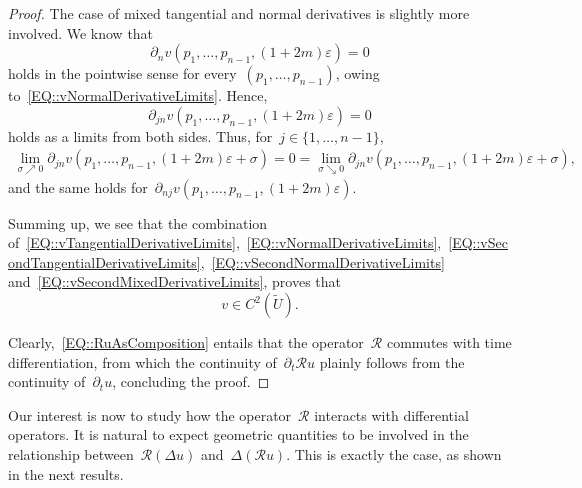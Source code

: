 \documentclass[12pt,a4paper]{amsart}
\numberwithin{equation}{section}
\theoremstyle{definition}
\theoremstyle{remark}
\newcommand{\eps}{\varepsilon}
\begin{document}
\begin{proof}
    The case of mixed tangential and normal derivatives is slightly more involved. We know that
    \begin{equation}
        \partial_n v(p_1, \dots, p_{n-1}, (1+2m)\eps) = 0
    \end{equation}
    holds in the pointwise sense for every~$(p_1,\dots,p_{n-1})$, owing to~\eqref{EQ::vNormalDerivativeLimits}. Hence,
    \begin{equation}
        \partial_{jn} v(p_1, \dots, p_{n-1}, (1+2m)\eps) = 0
    \end{equation}
    holds as a limits from both sides. Thus, for~$j \in \{1,\dots,n-1\}$,
    \begin{align}\label{EQ::vSecondMixedDerivativeLimits}
        \lim_{\sigma \nearrow 0} \partial_{jn} v(p_1, \dots, p_{n-1}, (1+2m)\eps + \sigma) = 0 = \lim_{\sigma \searrow 0} \partial_{jn} v(p_1, \dots, p_{n-1}, (1+2m)\eps + \sigma),
    \end{align}
    and the same holds for~$\partial_{nj} v(p_1, \dots, p_{n-1}, (1+2m)\eps)$.

    Summing up, we see that the combination of~\eqref{EQ::vTangentialDerivativeLimits},~\eqref{EQ::vNormalDerivativeLimits},~\eqref{EQ::vSecondTangentialDerivativeLimits},~\eqref{EQ::vSecondNormalDerivativeLimits} and~\eqref{EQ::vSecondMixedDerivativeLimits}, proves that
    \[v \in C^2(\tilde{U}).\]

    Clearly,~\eqref{EQ::RuAsComposition} entails that the operator~$\mathcal{R}$ commutes with time differentiation, from which the continuity of~$\partial_t \mathcal{R} u$ plainly follows from the continuity of~$\partial_t u$, concluding the proof.
\end{proof}

Our interest is now to study how the operator~$\mathcal{R}$ interacts with differential operators. It is natural to expect geometric quantities to be involved in the relationship between~$\mathcal{R}(\Delta u)$ and~$\Delta(\mathcal{R}u)$. This is exactly the case, as shown in the next results.
\end{document}
